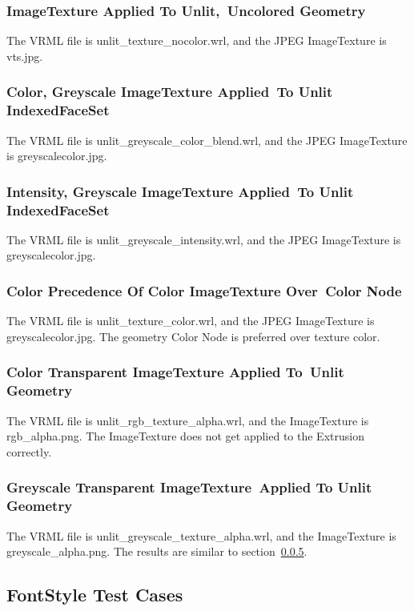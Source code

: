\documentclass[12pt,letterpaper]{article}
\newcommand{\AppGa}{ImageTexture Applied To Unlit,~}
\newcommand{\AppGb}{Uncolored Geometry}
\newcommand{\AppHa}{Color, Greyscale ImageTexture Applied~}
\newcommand{\AppHb}{To Unlit IndexedFaceSet}
\newcommand{\AppIa}{Intensity, Greyscale ImageTexture Applied~}
\newcommand{\AppIb}{To Unlit IndexedFaceSet}
\newcommand{\AppJa}{Color Precedence Of Color ImageTexture Over~}
\newcommand{\AppJb}{Color Node}
\newcommand{\AppKa}{Color Transparent ImageTexture Applied To~}
\newcommand{\AppKb}{Unlit Geometry}
\newcommand{\AppLa}{Greyscale Transparent ImageTexture~}
\newcommand{\AppLb}{Applied To Unlit Geometry}
\begin{document}
\subsubsection{\AppGa\AppGb}
\label{sec:unlit-texture-nocolor}
The VRML file is unlit\_texture\_nocolor.wrl, and the JPEG ImageTexture is vts.jpg.\newline

\subsubsection{\AppHa\AppHb}
The VRML file is unlit\_greyscale\_color\_blend.wrl, and the JPEG ImageTexture
is greyscalecolor.jpg.\newline

\subsubsection{\AppIa\AppIb}
The VRML file is unlit\_greyscale\_intensity.wrl, and the JPEG ImageTexture
is greyscalecolor.jpg.\newline

\subsubsection{\AppJa\AppJb}
The VRML file is unlit\_texture\_color.wrl, and the JPEG ImageTexture
is greyscalecolor.jpg.\newline
The geometry Color Node is preferred over texture color.

\subsubsection{\AppKa\AppKb}
\label{sec:unlit-rgb-texture}
The VRML file is unlit\_rgb\_texture\_alpha.wrl, and the ImageTexture
is rgb\_alpha.png.\newline
The ImageTexture does not get applied to the Extrusion correctly.

\subsubsection{\AppLa\AppLb}
The VRML file is unlit\_greyscale\_texture\_alpha.wrl, and the ImageTexture
is greyscale\_alpha.png.\newline
The results are similar to section~\ref{sec:unlit-rgb-texture}.

\subsection{FontStyle Test Cases}
\end{document}
